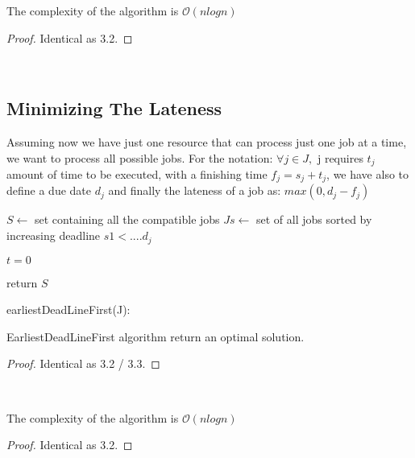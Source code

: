 \begin{claim}
    The complexity of the algorithm is $\mathcal{O}{(nlogn)}$
\end{claim}
\begin{proof}
    Identical as 3.2.
\end{proof}\\

\subsection{Minimizing The Lateness}
Assuming now we have just one resource that can process just one job at a time, we want to process all possible jobs. For the notation: $\forall j \in J,$ j requires  $t_{j}$ amount  of time to be executed, with a finishing time $f_{j} = s_{j} + t_{j}$, we have also to define a due date $d_{j}$ and finally the lateness of a job as: $max (0,d_{j}-f_{j})$

\begin{algorithm}[H]
    \SetAlgoLined
    \small
    \BlankLine

    $S \leftarrow$ set containing all the compatible jobs\;
    $Js \leftarrow$ set of all jobs sorted by increasing deadline $s1 < .... d_{j}$

    \BlankLine
    $t = 0 $\;

    \BlankLine

    return $S$\;
    \caption{earliestDeadLineFirst(J):}
\end{algorithm}

\begin{claim}
    EarliestDeadLineFirst algorithm return an optimal solution.
\end{claim}
\begin{proof}
    Identical as 3.2 / 3.3.
\end{proof}\\

\begin{claim}
    The complexity of the algorithm is $\mathcal{O}{(nlogn)}$
\end{claim}
\begin{proof}
    Identical as 3.2.
\end{proof}\\

